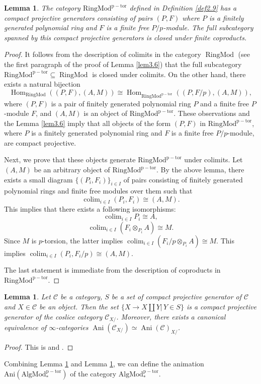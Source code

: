 \documentclass[11pt, a4paper]{amsart}
\theoremstyle{plain}
\newtheorem{lemma}[theorem]{Lemma}
\theoremstyle{definition}
\begin{document}
\begin{lemma}\label{lem3.7}
     The category $\operatorname{RingMod^{p-tor}}$ defined in Definition \ref{def2.9} has a compact projective generators consisting of pairs $(P,F)$ where $P$ is a finitely generated polynomial ring and $F$ is a finite free $P/p$-module. The full subcategory spanned by this compact projective generators is closed under finite coproducts.
\end{lemma}
\begin{proof}
    It follows from the description of colimits in the category $\operatorname{RingMod}$ (see the first paragraph of the proof of Lemma \ref{lem3.6}) that the full subcategory $\operatorname{RingMod^{p-tor}}\subseteq \operatorname{RingMod}$ is closed under colimits. On the other hand, there exists a natural bijection \[\operatorname{Hom}_{\operatorname{RingMod}}((P,F),(A,M))\cong \operatorname{Hom}_{\operatorname{RingMod^{p-tor}}}((P,F/p),(A,M)),\] where $(P,F)$ is a pair of finitely generated polynomial ring $P$ and a finite free $P$-module $F$, and $(A,M)$ is an object of $\operatorname{RingMod^{p-tor}}$. These observations and the Lemma \ref{lem3.6} imply that all objects of the form $(P,F)$ in $\operatorname{RingMod^{p-tor}}$, where $P$ is a finitely generated polynomial ring and $F$ is a finite free $P/p$-module, are compact projective.

    Next, we prove that these objects generate $\operatorname{RingMod^{p-tor}}$ under colimits. Let $(A,M)$ be an arbitrary object of $\operatorname{RingMod^{p-tor}}$. By the above lemma, there exists a small diagram $\{(P_i,F_i)\}_{i\in I}$ of pairs consisting of finitely generated polynomial rings and finite free modules over them such that \[\operatorname{colim}_{i\in I}(P_i,F_i)\cong (A,M).\] This implies that there exists a following isomorphisms:\[\operatorname{colim}_{i\in I}P_i\cong A,\]\[\operatorname{colim}_{i\in I}(F_i\otimes_{P_i}A)\cong M.\] Since $M$ is $p$-torsion, the latter implies $\operatorname{colim}_{i\in I}(F_i/p\otimes_{P_i}A)\cong M$. This implies $\operatorname{colim}_{i\in I}(P_i,F_i/p)\cong (A,M)$. 

    The last statement is immediate from the description of coproducts in $\operatorname{RingMod^{p-tor}}$.
\end{proof}
\begin{lemma}\label{lem3.8}
    Let $\mathscr C$ be a category, $S$ be a set of compact projective generator of $\mathscr C$ and $X\in \mathscr C$ be an object. Then the set $\{X\to X\coprod Y|\,Y\in S\}$ is a compact projective generator of the coslice category $\mathscr C_{X/}$. Moreover, there exists a canonical equivalence of $\infty$-categories $\operatorname{Ani}(\mathscr C_{X/})\simeq \operatorname{Ani}(\mathscr C)_{X/}$.
\end{lemma}
\begin{proof}
    This is \cite[Lemma 2.12]{Mao24} and \cite[Corollary 2.14]{Mao24}.
\end{proof}
Combining Lemma \ref{lem3.7} and Lemma \ref{lem3.8}, we can define the animation $\operatorname{Ani(AlgMod_*^{p-tor})}$ of the category $\operatorname{AlgMod_*^{p-tor}}$.
\end{document}
